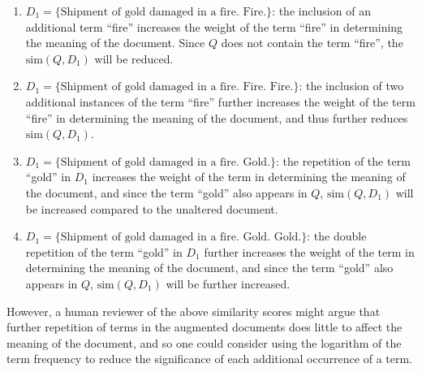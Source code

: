 \documentclass[a4paper]{article}
\begin{document}
\begin{enumerate}[label=\alph*)]
    \item   $D_1 = \{ \text{Shipment of gold damaged in a fire. Fire.} \}$:
            the inclusion of an additional term ``fire'' increases the weight of the term ``fire'' in determining the meaning of the document.
            Since $Q$ does not contain the term ``fire'', the $\text{sim}(Q, D_1)$ will be reduced.

    \item   $D_1 = \{ \text{Shipment of gold damaged in a fire. Fire. Fire.} \}$:
            the inclusion of two additional instances of the term ``fire'' further increases the weight of the term ``fire'' in determining the meaning of the document, and thus further reduces $\text{sim}(Q, D_1)$.

    \item   $D_1 = \{ \text{Shipment of gold damaged in a fire. Gold.} \}$:
            the repetition of the term ``gold'' in $D_1$ increases the weight of the term in determining the meaning of the document, and since the term ``gold'' also appears in $Q$, $\text{sim}(Q, D_1)$ will be increased compared to the unaltered document.

    \item   $D_1 = \{ \text{Shipment of gold damaged in a fire. Gold. Gold.} \}$:
            the double repetition of the term ``gold'' in $D_1$ further increases the weight of the term in determining the meaning of the document, and since the term ``gold'' also appears in $Q$, $\text{sim}(Q, D_1)$ will be further increased.
\end{enumerate}

However, a human reviewer of the above similarity scores might argue that further repetition of terms in the augmented documents does little to affect the meaning of the document, and so one could consider using the logarithm of the term frequency to reduce the significance of each additional occurrence of a term.
\end{document}
